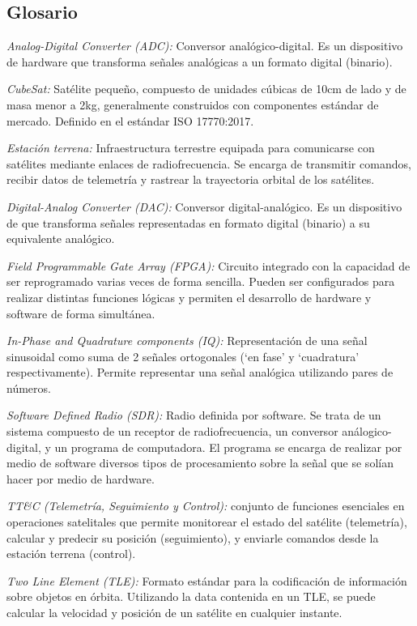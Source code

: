 \subsection{Glosario}
\textit{Analog-Digital Converter (ADC):} Conversor analógico-digital. Es un dispositivo de hardware que transforma señales analógicas a un formato digital (binario).

\textit{CubeSat:} Satélite pequeño, compuesto de unidades cúbicas de 10cm de lado y de masa menor a 2kg, generalmente construidos con componentes estándar de mercado. Definido en el estándar ISO 17770:2017.

\textit{Estación terrena:} Infraestructura terrestre equipada para comunicarse con satélites mediante enlaces de radiofrecuencia. Se encarga de transmitir comandos, recibir datos de telemetría y rastrear la trayectoria orbital de los satélites.

\textit{Digital-Analog Converter (DAC):} Conversor digital-analógico. Es un dispositivo de que transforma señales representadas en formato digital (binario) a su equivalente analógico.

\textit{Field Programmable Gate Array (FPGA):} Circuito integrado con la capacidad de ser reprogramado varias veces de forma sencilla. Pueden ser configurados para realizar distintas funciones lógicas y permiten el desarrollo de hardware y software de forma simultánea.

\textit{In-Phase and Quadrature components (IQ):} Representación de una señal sinusoidal como suma de 2 señales ortogonales (`en fase' y `cuadratura' respectivamente). Permite representar una señal analógica utilizando pares de números.

\textit{Software Defined Radio (SDR):} Radio definida por software. Se trata de un sistema compuesto de un receptor de radiofrecuencia, un conversor análogico-digital, y un programa de computadora. El programa se encarga de realizar por medio de software diversos tipos de procesamiento sobre la señal que se solían hacer por medio de hardware.

\textit{TT\&C (Telemetría, Seguimiento y Control):} conjunto de funciones esenciales en operaciones satelitales que permite monitorear el estado del satélite (telemetría), calcular y predecir su posición (seguimiento), y enviarle comandos desde la estación terrena (control).

\textit{Two Line Element (TLE):} Formato estándar para la codificación de información sobre objetos en órbita. Utilizando la data contenida en un TLE, se puede calcular la velocidad y posición de un satélite en cualquier instante.

